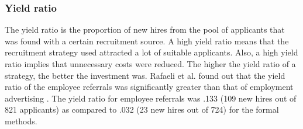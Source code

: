 \documentclass[Main.tex]{subfiles}
\begin{document}


\subsubsection*{Yield ratio}
The yield ratio is the proportion of new hires from the pool of applicants that was found with a certain recruitment source. A high yield ratio means that the recruitment strategy used attracted a lot of suitable applicants. Also, a high yield ratio implies that unnecessary costs were reduced. The higher the yield ratio of a strategy, the better the investment was. 
Rafaeli et al. found out that the yield ratio of the employee referrals was significantly greater than that of employment advertising \cite{fourth}. The yield ratio for employee referrals was .133 (109 new
hires out of 821 applicants) as compared to .032 (23 new hires out of 724) for the formal methods. 
\end{document}
